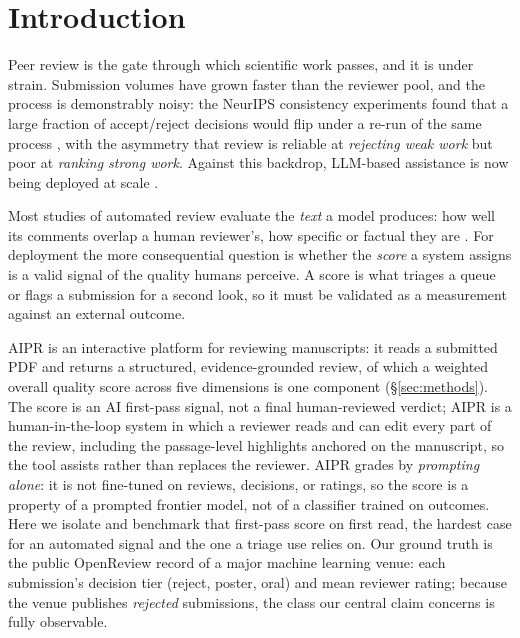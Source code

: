 \ifnmibuild\else
\section{Introduction}
\label{sec:intro}
\fi

Peer review is the gate through which scientific work passes, and it is under strain.
Submission volumes have grown faster than the reviewer pool, and the process is
demonstrably noisy: the NeurIPS consistency experiments found that a large fraction of
accept/reject decisions would flip under a re-run of the same process
\citep{cortes2021inconsistency,beygelzimer2023arbitrary}, with the asymmetry that
review is reliable at \emph{rejecting weak work} but poor at \emph{ranking strong
work}. Against this backdrop, LLM-based assistance is now being deployed at scale
\citep{thakkar2026feedback,biswas2026aaai}.

Most studies of automated review evaluate the \emph{text} a model produces: how well
its comments overlap a human reviewer's, how specific or factual they are
\citep{liang2024llm,darcy2024marg,yuan2022automate,du2024llmsassist}. For deployment
the more consequential question is whether the \emph{score} a system assigns is a valid
signal of the quality humans perceive. A score is what triages a queue or flags a
submission for a second look, so it must be validated as a measurement against an
external outcome.

\ifnmibuild\fi

\textsc{AIPR} is an interactive platform for reviewing manuscripts: it reads a submitted
PDF and returns a structured, evidence-grounded review, of which a weighted overall
quality score across five dimensions is one component (\S\ref{sec:methods}). The score is
an AI first-pass signal, not a final human-reviewed verdict; AIPR is a human-in-the-loop
system in which a reviewer reads and can edit every part of the review, including the
passage-level highlights anchored on the manuscript, so the tool assists rather than
replaces the reviewer. AIPR grades by \emph{prompting alone}: it is not
fine-tuned on reviews, decisions, or ratings, so the score is a property of a prompted
frontier model, not of a classifier trained on outcomes. Here we isolate and benchmark
that first-pass score on first read, the hardest case for an automated signal and the one
a triage use relies on. Our ground truth is the public OpenReview record of a major
machine learning venue: each submission's decision tier (reject, poster, oral) and mean
reviewer rating; because the venue publishes \emph{rejected} submissions, the class our
central claim concerns is fully observable.

